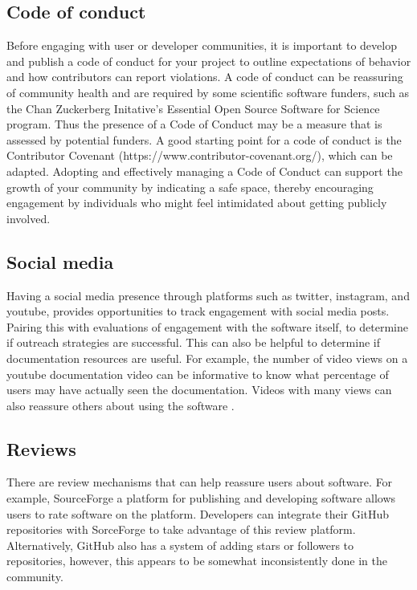 \documentclass{article}
\begin{document}
\subsection{Code of conduct}
Before engaging with user or developer communities, it is important to develop and publish a code of conduct for your project to outline expectations of behavior and how contributors can report violations. A code of conduct can be reassuring of community health and are required by some scientific software funders, such as the Chan Zuckerberg Initative’s Essential Open Source Software for Science program. Thus the presence of a Code of Conduct may be a measure that is assessed by potential funders. A good starting point for a code of conduct is the Contributor Covenant (https://www.contributor-covenant.org/), which can be adapted. Adopting and effectively managing\cite{aurora_how_2019} a  Code of Conduct can support the growth of your community by indicating a safe space, thereby encouraging engagement by individuals who might feel intimidated about getting publicly involved.

\subsection{Social media}
Having a social media presence through platforms such as twitter, instagram, and youtube, provides opportunities to track engagement with social media posts.  Pairing this with evaluations of engagement with the software itself, to determine if outreach strategies are successful. This can also be helpful to determine if documentation resources are useful. For example, the number of video views on a youtube documentation video can be informative to know what percentage of users may have actually seen the documentation. Videos with many views can also reassure others about using the software . 

\subsection{Reviews}
There are review mechanisms that can help reassure users about software. For example, SourceForge\cite{sourceforge} a platform for publishing and developing software allows users to rate software on the platform. Developers can integrate their GitHub repositories with SorceForge to take advantage of this review platform. Alternatively, GitHub also has a system of adding stars or followers to repositories, however, this appears to be somewhat inconsistently done in the community. 
\end{document}

